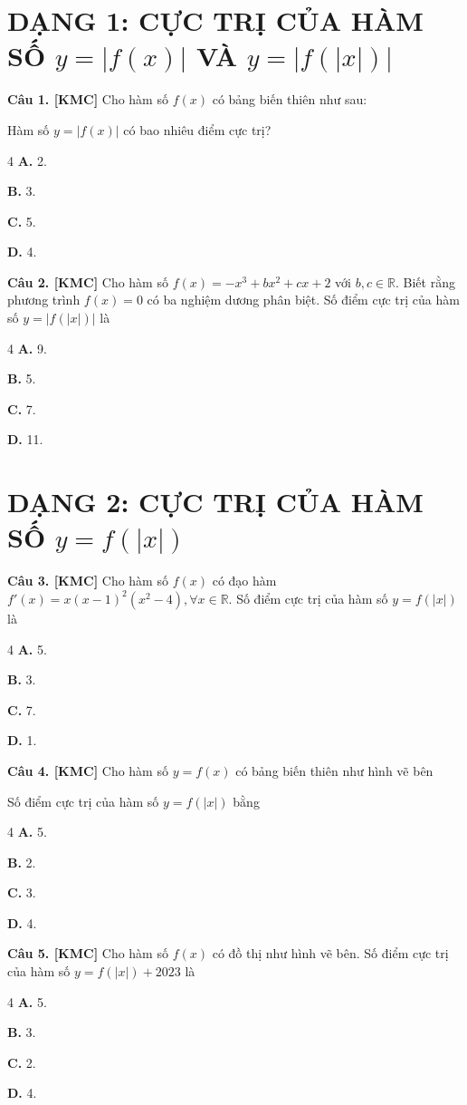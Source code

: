 \documentclass[12pt,a4paper]{article}
\newcommand{\cau}[1]{\noindent\textbf{Câu #1. [KMC]} }
\newcommand{\bonpa}[4]{
    \begin{multicols}{4}
        \noindent\textbf{A.} #1
        \par\noindent\textbf{B.} #2
        \par\noindent\textbf{C.} #3
        \par\noindent\textbf{D.} #4
    \end{multicols}
}
\begin{document}
\section*{DẠNG 1: CỰC TRỊ CỦA HÀM SỐ $y = |f(x)|$ VÀ $y = |f(|x|)|$}

\cau{1} Cho hàm số $f(x)$ có bảng biến thiên như sau:
\begin{center}
\end{center}
Hàm số $y = |f(x)|$ có bao nhiêu điểm cực trị?
\bonpa{2.}{3.}{5.}{4.}

\cau{2} Cho hàm số $f(x) = -x^3 + bx^2 + cx + 2$ với $b, c \in \mathbb{R}$. Biết rằng phương trình $f(x) = 0$ có ba nghiệm dương phân biệt. Số điểm cực trị của hàm số $y = |f(|x|)|$ là
\bonpa{9.}{5.}{7.}{11.}

\section*{DẠNG 2: CỰC TRỊ CỦA HÀM SỐ $y = f(|x|)$}

\cau{3} Cho hàm số $f(x)$ có đạo hàm $f'(x) = x(x-1)^2(x^2-4), \forall x \in \mathbb{R}$. Số điểm cực trị của hàm số $y = f(|x|)$ là
\bonpa{5.}{3.}{7.}{1.}

\cau{4} Cho hàm số $y = f(x)$ có bảng biến thiên như hình vẽ bên
\begin{center}
\end{center}
Số điểm cực trị của hàm số $y = f(|x|)$ bằng
\bonpa{5.}{2.}{3.}{4.}

\cau{5} Cho hàm số $f(x)$ có đồ thị như hình vẽ bên. Số điểm cực trị của hàm số $y = f(|x|) + 2023$ là
\begin{center}
\end{center}
\bonpa{5.}{3.}{2.}{4.}
\end{document}
